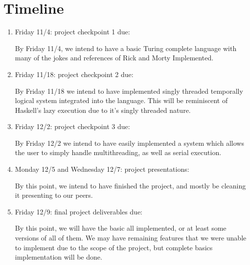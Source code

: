 \documentclass[numbers]{sigplanconf}
\begin{document}
\section{Timeline}
\begin{enumerate}
\item    Friday 11/4: project checkpoint 1 due:

  By Friday 11/4, we intend to have a basic Turing complete language
  with many of the jokes and references of Rick and Morty Implemented.

\item  Friday 11/18: project checkpoint 2 due:

By Friday 11/18 we intend to have implemented singly threaded
temporally logical system integrated into the language. This will be 
reminiscent of Haskell's lazy execution due to it's singly threaded nature.

\item  Friday 12/2: project checkpoint 3 due:
  
  By Friday 12/2 we intend to have easily implemented a system which
  allows the user to simply handle multithreading, as well as serial execution.

\item  Monday 12/5 and Wednesday 12/7: project presentations:

By this point, we intend to have finished the project, and mostly be
cleaning it presenting to our peers.

\item Friday 12/9: final project deliverables due:

By this point, we will have the basic all implemented, or at least
some versions of all of them. We may have remaining features that we
were unable to implement due to the scope of the project, but complete
basics implementation will be done.
\end{enumerate}





{}
\end{document}
